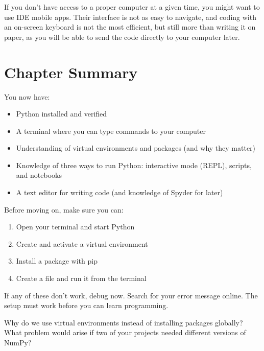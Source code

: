 \begin{note}
If you don't have access to a proper computer at a given time, you might want to use IDE mobile apps. Their interface is not as easy to navigate, and coding with an on-screen keyboard is not the most efficient, but still more than writing it on paper, as you will be able to send the code directly to your computer later.
\end{note}

\section{Chapter Summary}
\label{sec:setup-summary}

You now have:

\begin{itemize}
    \item Python installed and verified
    \item A terminal where you can type commands to your computer
    \item Understanding of virtual environments and packages (and why they matter)
    \item Knowledge of three ways to run Python: interactive mode (REPL), scripts, and notebooks
    \item A text editor for writing code (and knowledge of Spyder for later)
\end{itemize}

Before moving on, make sure you can:

\begin{enumerate}
    \item Open your terminal and start Python
    \item Create and activate a virtual environment
    \item Install a package with pip
    \item Create a  file and run it from the terminal
\end{enumerate}

If any of these don't work, debug now. Search for your error message online. The setup must work before you can learn programming.

\begin{ponder}
Why do we use virtual environments instead of installing packages globally? What problem would arise if two of your projects needed different versions of NumPy?
\end{ponder}
